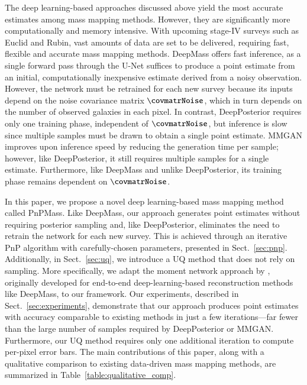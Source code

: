 \documentclass{aa}
\begin{document}
The deep learning-based approaches discussed above yield the most accurate estimates among mass mapping methods. However, they are significantly more computationally and memory intensive. With upcoming stage-IV surveys such as Euclid and Rubin, vast amounts of data are set to be delivered, requiring fast, flexible and accurate mass mapping methods. DeepMass offers fast inference, as a single forward pass through the U-Net suffices to produce a point estimate from an initial, computationally inexpensive estimate derived from a noisy observation. However, the network must be retrained for each new survey because its inputs depend on the noise covariance matrix $\covmatrNoise$, which in turn depends on the number of observed galaxies in each pixel. In contrast, DeepPosterior requires only one training phase, independent of $\covmatrNoise$, but inference is slow since multiple samples must be drawn to obtain a single point estimate. MMGAN improves upon inference speed by reducing the generation time per sample; however, like DeepPosterior, it still requires multiple samples for a single estimate. Furthermore, like DeepMass and unlike DeepPosterior, its training phase remains dependent on $\covmatrNoise$.

In this paper, we propose a novel deep learning-based mass mapping method called PnPMass. Like DeepMass, our approach generates point estimates without requiring posterior sampling and, like DeepPosterior, eliminates the need to retrain the network for each new survey. This is achieved through an iterative PnP algorithm with carefully-chosen parameters, presented in Sect.~\ref{sec:pnp}. Additionally, in Sect.~\ref{sec:uq}, we introduce a UQ method that does not rely on sampling. More specifically, we adapt the moment network approach by \citet{Jeffrey2020a}, originally developed for end-to-end deep-learning-based reconstruction methods like DeepMass, to our framework. Our experiments, described in Sect.~\ref{sec:experiments}, demonstrate that our approach produces point estimates with accuracy comparable to existing methods in just a few iterations---far fewer than the large number of samples required by DeepPosterior or MMGAN. Furthermore, our UQ method requires only one additional iteration to compute per-pixel error bars. The main contributions of this paper, along with a qualitative comparison to existing data-driven mass mapping methods, are summarized in Table~\ref{table:qualitative_comp}. 
\end{document}
